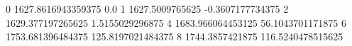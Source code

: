 0 1627.8616943359375 0.0
1 1627.5009765625 -0.3607177734375
2 1629.377197265625 1.5155029296875
4 1683.966064453125 56.1043701171875
6 1753.681396484375 125.8197021484375
8 1744.3857421875 116.5240478515625
